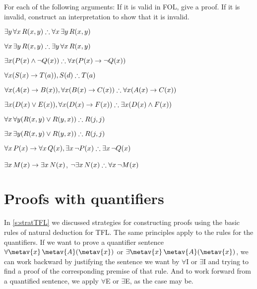 \solutions
\problempart
\label{pr.FOLvalidornot}
For each of the following arguments: If it is valid in FOL, give a proof. If it is invalid, construct an interpretation to show that it is invalid.
\begin{compactlist}
\item $\exists y\,\forall x\,\atom{R}{x,y} \therefore \forall x\,\exists y\,\atom{R}{x,y}$
\item $\forall x\,\exists y\,\atom{R}{x,y} \therefore  \exists y\,\forall x\,\atom{R}{x,y}$
\item $\exists x(\atom{P}{x} \eand \enot \atom{Q}{x}) \therefore \forall x(\atom{P}{x} \eif \enot \atom{Q}{x})$
\item $\forall x(\atom{S}{x} \eif \atom{T}{a}), \atom{S}{d} \therefore \atom{T}{a}$
\item $\forall x(\atom{A}{x}\eif \atom{B}{x}), \forall x(\atom{B}{x} \eif \atom{C}{x}) \therefore \forall x(\atom{A}{x} \eif \atom{C}{x})$
\item $\exists x(\atom{D}{x} \eor \atom{E}{x}), \forall x(\atom{D}{x} \eif \atom{F}{x}) \therefore \exists x(\atom{D}{x} \eand \atom{F}{x})$
\item $\forall x\,\forall y(\atom{R}{x,y} \eor \atom{R}{y,x}) \therefore \atom{R}{j,j}$
\item $\exists x\,\exists y(\atom{R}{x,y} \eor \atom{R}{y,x}) \therefore \atom{R}{j,j}$
\item $\forall x\,\atom{P}{x} \eif \forall x\,\atom{Q}{x}, \exists x\, \enot\atom{P}{x} \therefore \exists x\, \enot \atom{Q}{x}$
\item $\exists x\,\mathord{M}(x) \rightarrow \exists x\,\mathord{N}(x)$, $\enot \exists x\,\atom{N}{x}\therefore  \forall x\, \enot \atom{M}{x}$
\end{compactlist}

\chapter{Proofs with quantifiers}

In \cref{s:stratTFL} we discussed strategies for constructing proofs
using the basic rules of natural deduction for TFL. The same
principles apply to the rules for the quantifiers. If we want to prove
a quantifier sentence $\forall \metav{x}\,
\atom{\metav{A}}{\metav{x}}$ or $\exists \metav{x}\,
\atom{\metav{A}}{\metav{x}}$, we can work backward by justifying the
sentence we want by $\forall$I or $\exists$I and trying to find a
proof of the corresponding premise of that rule. And to work forward
from a quantified sentence, we apply $\forall$E or $\exists$E, as the
case may be.


